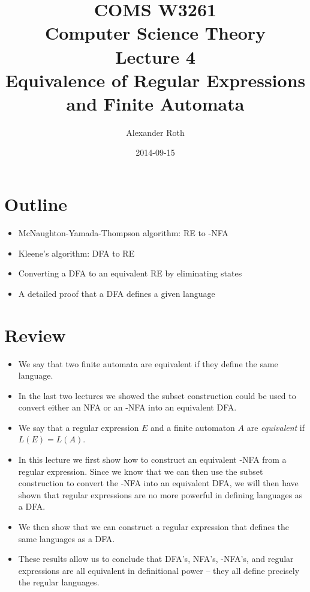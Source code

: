 \documentclass[]{article}
\begin{document}
\newtheorem{thm}{Theorem}

\title{COMS W3261 \\ Computer Science Theory \\ Lecture 4\\ Equivalence of
Regular Expressions and Finite Automata}
\author{Alexander Roth}
\date{2014-09-15}
\maketitle
\section*{Outline}
  \begin{itemize}
    \item McNaughton-Yamada-Thompson algorithm: RE to \textepsilon-NFA
    \item Kleene's algorithm: DFA to RE
    \item Converting a DFA to an equivalent RE by eliminating states
    \item A detailed proof that a DFA defines a given language
  \end{itemize}

\section{Review}
  \begin{itemize}
    \item We say that two finite automata are equivalent if they define the same
    language.
    \item In the last two lectures we showed the subset construction could be
    used to convert either an NFA or an \textepsilon-NFA into an equivalent DFA.
    \item We say that a regular expression $E$ and a finite automaton $A$ are
    \emph{equivalent} if $L(E) = L(A)$.
    \item In this lecture we first show how to construct an equivalent
    \textepsilon-NFA from a regular expression. Since we know that we can then
    use the subset construction to convert the \textepsilon-NFA into an
    equivalent DFA, we will then have shown that regular expressions are no more
    powerful in defining languages as a DFA.
    \item We then show that we can construct a regular expression that defines
    the same languages as a DFA.
    \item These results allow us to conclude that DFA's, NFA's,
    \textepsilon-NFA's, and regular expressions are all equivalent in
    definitional power -- they all define precisely the regular languages.
  \end{itemize}
\end{document}
